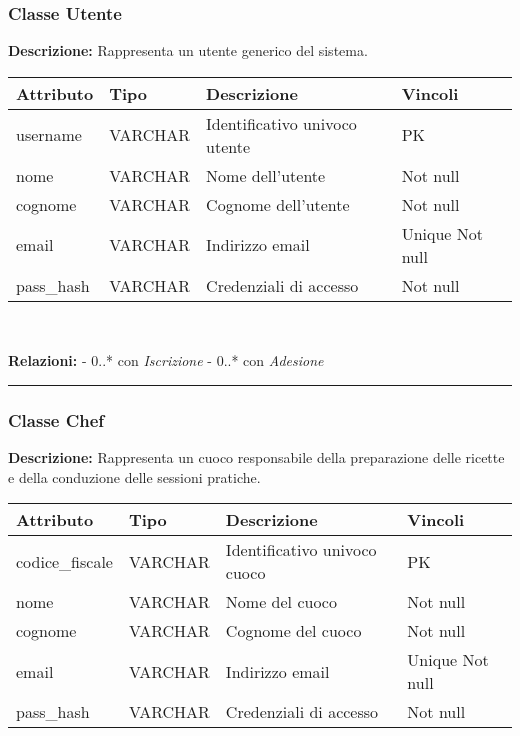 \documentclass[a4paper, 12pt]{article}
\begin{document}
    \subsubsection*{Classe Utente}
        \textbf{Descrizione:} Rappresenta un utente generico del sistema.
        
        {
        \vspace{1em}
        \renewcommand{\arraystretch}{1.3}
        \begin{tabular}{|l|l|l|l|}
        \hline
        \textbf{Attributo} & \textbf{Tipo} & \textbf{Descrizione} & \textbf{Vincoli} \\
        \hline
        username & VARCHAR      & Identificativo univoco utente & PK \\
        nome     & VARCHAR      & Nome dell'utente & Not null \\
        cognome  & VARCHAR      & Cognome dell'utente & Not null \\
        email    & VARCHAR      & Indirizzo email & Unique Not null \\
        pass\_hash & VARCHAR      & Credenziali di accesso & Not null \\
        \hline
        \end{tabular}\\[0.5em]
        }

        \noindent\textbf{Relazioni:}  
        - 0..* con \textit{Iscrizione}  
        - 0..* con \textit{Adesione}

    \noindent\rule{\textwidth}{0.1pt}

    \subsubsection*{Classe Chef}
        \textbf{Descrizione:} Rappresenta un cuoco responsabile della preparazione delle ricette e della conduzione delle sessioni pratiche.
        
        {
        \vspace{1em}
        \renewcommand{\arraystretch}{1.3}
        \begin{tabular}{|l|l|l|l|}
        \hline
        \textbf{Attributo} & \textbf{Tipo} & \textbf{Descrizione} & \textbf{Vincoli} \\
        \hline
        codice\_fiscale & VARCHAR      & Identificativo univoco cuoco & PK \\
        nome            & VARCHAR      & Nome del cuoco & Not null \\
        cognome         & VARCHAR      & Cognome del cuoco & Not null \\
        email           & VARCHAR      & Indirizzo email & Unique Not null \\
        pass\_hash      & VARCHAR      & Credenziali di accesso & Not null \\
        \hline
        \end{tabular}\\[0.5em]
        }
        
\end{document}

